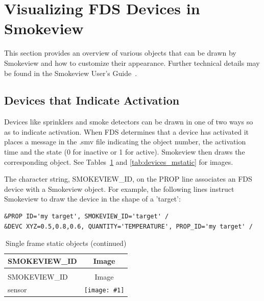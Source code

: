 
\newcommand{\devicewidth}{1.5in}
\newcommand{\boxwidth}{3.0in}
\newcommand{\incgraphics}[1]{
\parbox[c]{\devicewidth}{
\vspace{0.01in}
\texttt{[image: \#1]}
\vspace{0.01in}
}
}

\section{Visualizing FDS Devices in Smokeview}

This section provides an overview of various objects that can be drawn by Smokeview and how to customize their appearance. Further technical details may be found in the Smokeview User's Guide~\cite{Smokeview_Users_Guide}. 


\subsection{Devices that Indicate Activation}
\label{info:SMOKEVIEW_ID}

Devices like sprinklers and smoke detectors can be drawn in one of two ways so as to indicate activation. When FDS determines that a device has activated it places a message in the {\ct .smv} file indicating the object number, the activation time and the state (0 for inactive or 1 for active). Smokeview then draws the corresponding object. See Tables~\ref{tab:devices_static} and \ref{tab:devices_mstatic} for images.

The character string, {\ct SMOKEVIEW\_ID}, on the {\ct PROP} line associates an FDS device with a Smokeview object. For example, the following lines instruct Smokeview to draw the device in the shape of a {\ct 'target'}:
\begin{lstlisting}
&PROP ID='my target', SMOKEVIEW_ID='target' /
&DEVC XYZ=0.5,0.8,0.6, QUANTITY='TEMPERATURE', PROP_ID='my target' /
\end{lstlisting}


\begin{longtable}[t!]{|l|c|}
\caption{Single frame static objects}
\label{tab:devices_static}
\\ \hline
{\ct SMOKEVIEW\_ID} & Image  \\ \hline \hline
\endfirsthead
\caption{Single frame static objects (continued)} \\ \hline
{\ct SMOKEVIEW\_ID} & Image  \\ \hline \hline
\endhead

{\ct sensor} & \incgraphics{SCRIPT_FIGURES/sensor} \\ \hline
{\ct target} & \incgraphics{SCRIPT_FIGURES/target} \\ \hline

\end{longtable}


